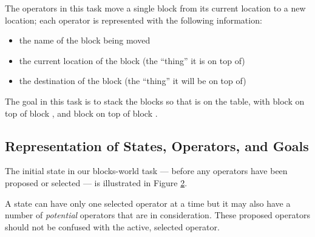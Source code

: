 \begin{figure}
\label{fig:blocks}
\end{figure}

The operators in this task move a single block from its current location to a
new location; each operator is represented with the following information: 
\vspace{-12pt}
\begin{itemize}
\item the name of the block being moved \vspace{-9pt}
\item the current location of the block (the ``thing'' it is on top of) \vspace{-9pt}
\item the destination of the block (the ``thing'' it will be on top of) 
\vspace{-9pt}
\end{itemize}

The goal in this task is to stack the blocks so that  is on the
table, with block  on top of block , and block  on
top of block .

\subsection{Representation of States, Operators, and Goals}
\label{OVERVIEW-ps-representation}

The initial state in our blocks-world task --- before any operators have been
proposed or selected --- is illustrated in Figure \ref{fig:ab-wmem}.

\begin{figure}
\label{fig:ab-wmem}
\end{figure}

A state can have only one selected operator at a time
but it may also have a number of \emph{potential} operators that are in consideration.
These proposed operators should not be confused with the active, selected operator.

